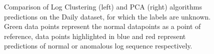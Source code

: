 \begin{figure}%
    \centering
    \qquad
    \qquad
    \qquad
    \caption{Comparison of Log Clustering (left) and PCA (right) algorithms predictions on the Daily dataset, for which the labels are unknown. Green data points represent the normal datapoints as a point of reference, data points highlighted in blue and red represent predictions of normal or anomalous log sequence respectively.}%
    \label{fig:tsne-predictions-labeled}%
\end{figure}

